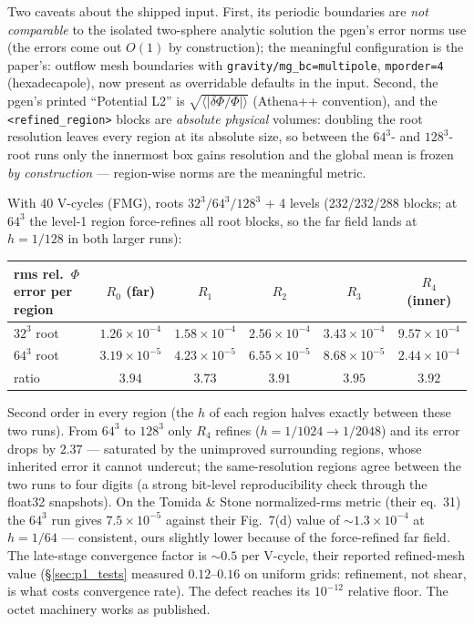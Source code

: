 \documentclass[11pt]{article}
\newcommand{\code}[1]{\texttt{#1}}
\begin{document}
Two caveats about the shipped input. First, its periodic boundaries are
\emph{not comparable} to the isolated two-sphere analytic solution the pgen's error
norms use (the errors come out $O(1)$ by construction); the meaningful configuration
is the paper's: outflow mesh boundaries with
\code{gravity/mg\_bc=multipole}, \code{mporder=4} (hexadecapole), now present as
overridable defaults in the input. Second, the pgen's printed ``Potential L2'' is
$\sqrt{\langle|\delta\Phi/\Phi|\rangle}$ (Athena++ convention), and the
\code{<refined\_region>} blocks are \emph{absolute physical} volumes: doubling the
root resolution leaves every region at its absolute size, so between the $64^3$- and
$128^3$-root runs only the innermost box gains resolution and the global mean is
frozen \emph{by construction} --- region-wise norms are the meaningful metric.

With 40 V-cycles (FMG), roots $32^3/64^3/128^3$ + 4 levels (232/232/288 blocks; at
$64^3$ the level-1 region force-refines all root blocks, so the far field lands at
$h{=}1/128$ in both larger runs):
\begin{center}
\small
\begin{tabular}{@{}lccccc@{}}
\toprule
rms rel.\ $\Phi$ error per region & $R_0$ (far) & $R_1$ & $R_2$ & $R_3$ & $R_4$ (inner) \\
\midrule
$32^3$ root  & $1.26\times10^{-4}$ & $1.58\times10^{-4}$ & $2.56\times10^{-4}$ & $3.43\times10^{-4}$ & $9.57\times10^{-4}$ \\
$64^3$ root  & $3.19\times10^{-5}$ & $4.23\times10^{-5}$ & $6.55\times10^{-5}$ & $8.68\times10^{-5}$ & $2.44\times10^{-4}$ \\
ratio        & $3.94$ & $3.73$ & $3.91$ & $3.95$ & $3.92$ \\
\bottomrule
\end{tabular}
\end{center}
Second order in every region (the $h$ of each region halves exactly between these two
runs). From $64^3$ to $128^3$ only $R_4$ refines ($h = 1/1024 \to 1/2048$) and its
error drops by $2.37$ --- saturated by the unimproved surrounding regions, whose
inherited error it cannot undercut; the same-resolution regions agree between the two
runs to four digits (a strong bit-level reproducibility check through the float32
snapshots). On the Tomida \& Stone normalized-rms metric (their eq.~31) the $64^3$
run gives $7.5\times10^{-5}$ against their Fig.~7(d) value of ${\sim}1.3\times10^{-4}$
at $h{=}1/64$ --- consistent, ours slightly lower because of the force-refined far
field. The late-stage convergence factor is ${\sim}0.5$ per V-cycle, their reported
refined-mesh value (\S\ref{sec:p1_tests} measured $0.12$--$0.16$ on uniform grids:
refinement, not shear, is what costs convergence rate). The defect reaches its
$10^{-12}$ relative floor. The octet machinery works as published.
\end{document}
